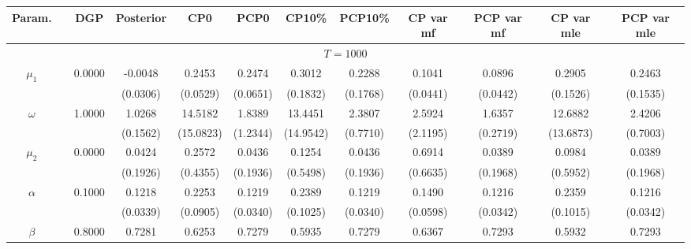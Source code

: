 { \renewcommand{\arraystretch}{1.2} 
\begin{sidewaystable} 
\center 
\begin{tabular}{cc cc| cccc| cccc} 
Param. && DGP & Posterior & CP0  & PCP0 & CP10\%  & PCP10\% &CP var mf & PCP var mf & CP var mle & PCP var mle \\ \hline 
\hline 
\multicolumn{12}{c}{$T =1000$}  \\ 
\hline 
\rowcolor{LightCyan} 
$\mu_{1}$&& 0.0000 & -0.0048 & 0.2453 & 0.2474 & 0.3012 & 0.2288 & 0.1041 & 0.0896 & 0.2905 & 0.2463  \\   
  &&   & (0.0306) & (0.0529) & (0.0651) & (0.1832) & (0.1768) &(0.0441) & (0.0442) & (0.1526) & (0.1535)  \\ 
\rowcolor{LightCyan} 
$\omega$&& 1.0000 & 1.0268 & 14.5182 & 1.8389 & 13.4451 & 2.3807 & 2.5924 & 1.6357 & 12.6882 & 2.4206  \\   
  &&   & (0.1562) & (15.0823) & (1.2344) & (14.9542) & (0.7710) &(2.1195) & (0.2719) & (13.6873) & (0.7003)  \\ 
\rowcolor{LightCyan} 
$\mu_{2}$&& 0.0000 & 0.0424 & 0.2572 & 0.0436 & 0.1254 & 0.0436 & 0.6914 & 0.0389 & 0.0984 & 0.0389  \\   
 &&   & (0.1926) & (0.4355) & (0.1936) & (0.5498) & (0.1936) &(0.6635) & (0.1968) & (0.5952) & (0.1968)  \\ 
\rowcolor{LightCyan} 
$\alpha$&& 0.1000 & 0.1218 & 0.2253 & 0.1219 & 0.2389 & 0.1219 & 0.1490 & 0.1216 & 0.2359 & 0.1216  \\   
 &&   & (0.0339) & (0.0905) & (0.0340) & (0.1025) & (0.0340) &(0.0598) & (0.0342) & (0.1015) & (0.0342)  \\ 
 \rowcolor{LightCyan} 
$\beta$&& 0.8000 & 0.7281 & 0.6253 & 0.7279 & 0.5935 & 0.7279 & 0.6367 & 0.7293 & 0.5932 & 0.7293  \\   

\end{tabular}
\end{sidewaystable}}
